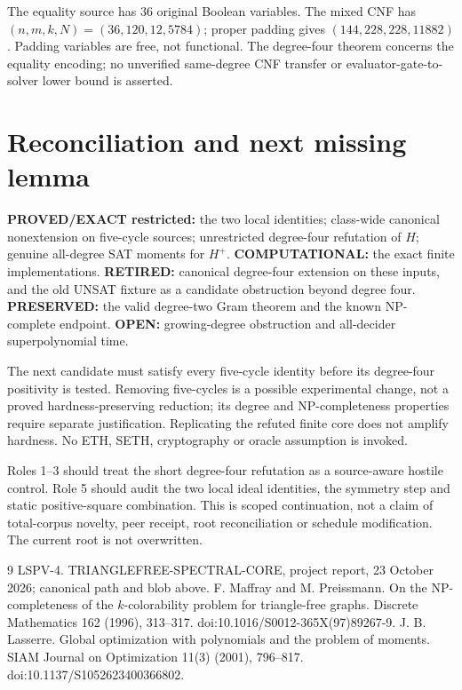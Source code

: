 \documentclass[11pt]{article}
\begin{document}
The equality source has 36 original Boolean variables. The mixed CNF has $(n,m,k,N)=(36,120,12,5784)$; proper padding gives $(144,228,228,11882)$. Padding variables are free, not functional. The degree-four theorem concerns the equality encoding; no unverified same-degree CNF transfer or evaluator-gate-to-solver lower bound is asserted.

\section{Reconciliation and next missing lemma}
\textbf{PROVED/EXACT restricted:} the two local identities; class-wide canonical nonextension on five-cycle sources; unrestricted degree-four refutation of $H$; genuine all-degree SAT moments for $H^+$. \textbf{COMPUTATIONAL:} the exact finite implementations. \textbf{RETIRED:} canonical degree-four extension on these inputs, and the old UNSAT fixture as a candidate obstruction beyond degree four. \textbf{PRESERVED:} the valid degree-two Gram theorem and the known NP-complete endpoint. \textbf{OPEN:} growing-degree obstruction and all-decider superpolynomial time.

The next candidate must satisfy every five-cycle identity before its degree-four positivity is tested. Removing five-cycles is a possible experimental change, not a proved hardness-preserving reduction; its degree and NP-completeness properties require separate justification. Replicating the refuted finite core does not amplify hardness. No ETH, SETH, cryptography or oracle assumption is invoked.

Roles 1--3 should treat the short degree-four refutation as a source-aware hostile control. Role 5 should audit the two local ideal identities, the symmetry step and static positive-square combination. This is scoped continuation, not a claim of total-corpus novelty, peer receipt, root reconciliation or schedule modification. The current root is not overwritten.

\begin{thebibliography}{9}
 LSPV-4. TRIANGLEFREE-SPECTRAL-CORE, project report, 23 October 2026; canonical path and blob above.
 F. Maffray and M. Preissmann. On the NP-completeness of the $k$-colorability problem for triangle-free graphs. Discrete Mathematics 162 (1996), 313--317. doi:10.1016/S0012-365X(97)89267-9.
 J. B. Lasserre. Global optimization with polynomials and the problem of moments. SIAM Journal on Optimization 11(3) (2001), 796--817. doi:10.1137/S1052623400366802.
\end{thebibliography}
\end{document}
